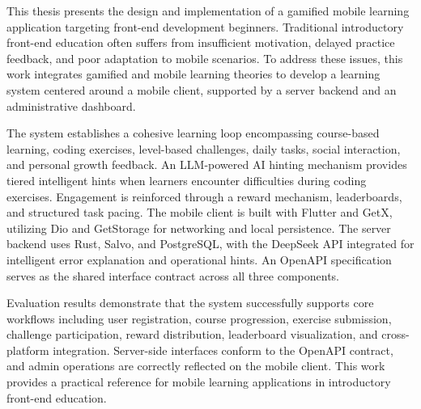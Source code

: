 
\begin{abstract}
本文围绕一款面向前端初学者的游戏化移动学习应用展开研究。针对传统前端学习动机不足、练习反馈滞后与移动场景适配薄弱等问题，本文设计并实现了一个以移动客户端为核心、服务端与管理后台端为支撑的学习系统。系统整合课程学习、编码练习、闯关挑战、每日任务、社交互动与成长反馈等功能构建学习闭环，并引入大语言模型驱动的 AI 辅助提示，在编码受阻时提供分层智能反馈，通过奖励、排行榜与任务节奏增强学习的参与感与持续性。

系统实现上，移动客户端基于 Flutter 与 GetX 构建，结合 Dio 与 GetStorage 完成接口访问与本地持久化；服务端采用 Rust、Salvo 与 PostgreSQL，并接入 DeepSeek API 实现编码场景下的智能错误解释与操作提示。三端以 OpenAPI 工具链为共享契约，贯穿接口设计、代码生成与测试验证全程。全文从需求分析、系统设计、功能实现与测试验证四个层面展开说明。

验证表明，系统能够完成注册登录、课程学习、练习提交、挑战参与、奖励反馈与跨端联调等核心流程。本文工作可为前端基础教育场景的移动学习应用设计提供参考。
\end{abstract}

\begin{abstractEn}
This thesis presents the design and implementation of a gamified mobile learning application targeting front-end development beginners. Traditional introductory front-end education often suffers from insufficient motivation, delayed practice feedback, and poor adaptation to mobile scenarios. To address these issues, this work integrates gamified and mobile learning theories to develop a learning system centered around a mobile client, supported by a server backend and an administrative dashboard.

The system establishes a cohesive learning loop encompassing course-based learning, coding exercises, level-based challenges, daily tasks, social interaction, and personal growth feedback. An LLM-powered AI hinting mechanism provides tiered intelligent hints when learners encounter difficulties during coding exercises. Engagement is reinforced through a reward mechanism, leaderboards, and structured task pacing. The mobile client is built with Flutter and GetX, utilizing Dio and GetStorage for networking and local persistence. The server backend uses Rust, Salvo, and PostgreSQL, with the DeepSeek API integrated for intelligent error explanation and operational hints. An OpenAPI specification serves as the shared interface contract across all three components.

Evaluation results demonstrate that the system successfully supports core workflows including user registration, course progression, exercise submission, challenge participation, reward distribution, leaderboard visualization, and cross-platform integration. Server-side interfaces conform to the OpenAPI contract, and admin operations are correctly reflected on the mobile client. This work provides a practical reference for mobile learning applications in introductory front-end education.
\end{abstractEn}
